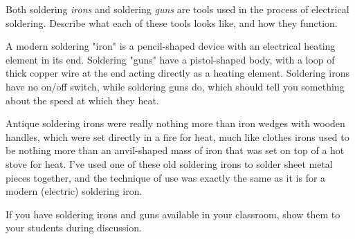 

Both soldering {\it irons} and soldering {\it guns} are tools used in the process of electrical soldering.  Describe what each of these tools looks like, and how they function.







A modern soldering "iron" is a pencil-shaped device with an electrical heating element in its end.  Soldering "guns" have a pistol-shaped body, with a loop of thick copper wire at the end acting directly as a heating element.  Soldering irons have no on/off switch, while soldering guns do, which should tell you something about the speed at which they heat.







Antique soldering irons were really nothing more than iron wedges with wooden handles, which were set directly in a fire for heat, much like clothes irons used to be nothing more than an anvil-shaped mass of iron that was set on top of a hot stove for heat.  I've used one of these old soldering irons to solder sheet metal pieces together, and the technique of use was exactly the same as it is for a modern (electric) soldering iron.

If you have soldering irons and guns available in your classroom, show them to your students during discussion.




